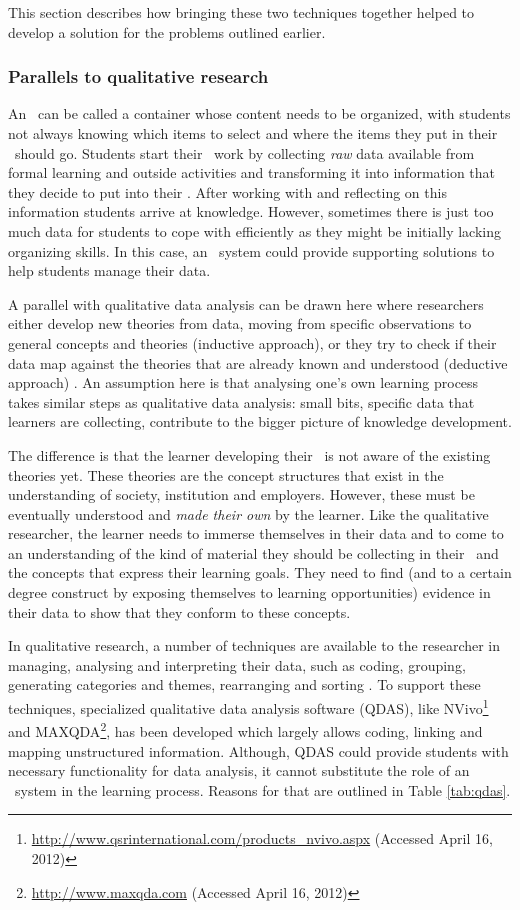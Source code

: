 This section describes how bringing these two techniques together helped to
develop a solution for the problems outlined earlier.

\subsubsection{Parallels to qualitative research}

An \ep~can be called a container whose content needs to be organized, with
students not always knowing which items to select and where the items they put
in their \ep~should go. Students start their \ep~work by collecting \textit{raw}
data available from formal learning and outside activities and transforming it
into information that they decide to put into their \ep. After working with and
reflecting on this information students arrive at knowledge. However, sometimes
there is just too much data for students to cope with efficiently as they might
be initially lacking organizing skills. In this case, an \ep~system could
provide supporting solutions to help students manage their data.

A parallel with qualitative data analysis can be drawn here where researchers
either develop new theories from data, moving from specific observations to
general concepts and theories (inductive approach), or they try to check if
their data map against the theories that are already known and understood
(deductive approach) \citep{Strauss2008,Patton2002}. An assumption here is that
analysing one's own learning process takes similar steps as qualitative data
analysis: small bits, specific data that learners are collecting, contribute to
the bigger picture of knowledge development. 

The difference is that the learner developing their \ep~is not aware of the
existing theories yet. These theories are the concept structures that exist in
the understanding of society, institution and employers. However, these must be
eventually understood and \textit{made their own} by the learner. Like the
qualitative researcher, the learner needs to immerse themselves in their data
and to come to an understanding of the kind of material they should be
collecting in their \ep~and the concepts that express their learning goals. They
need to find (and to a certain degree construct by exposing themselves to
learning opportunities) evidence in their data to show that they conform to
these concepts.

In qualitative research, a number of techniques are available to the researcher
in managing, analysing and interpreting their data, such as coding, grouping,
generating categories and themes, rearranging and sorting \citep{Marshall2010}.
To support these techniques, specialized qualitative data analysis software
(QDAS), like
NVivo\footnote{\url{http://www.qsrinternational.com/products_nvivo.aspx}
(Accessed April 16, 2012)} and MAXQDA\footnote{\url{http://www.maxqda.com}
(Accessed April 16, 2012)}, has been developed which largely allows coding,
linking and mapping unstructured information. Although, QDAS could provide
students with necessary functionality for data analysis, it cannot substitute
the role of an \ep~system in the learning process. Reasons for that are outlined
in Table \ref{tab:qdas}.

